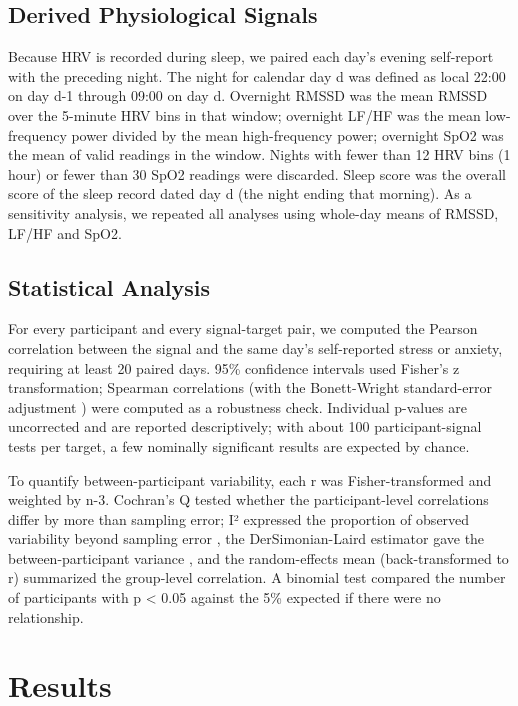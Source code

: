 \documentclass[11pt, a4paper, oneside]{article}
\begin{document}
\subsection{Derived Physiological Signals}
Because HRV is recorded during sleep, we paired each day's evening self-report with the preceding night. The night for calendar day d was defined as local 22:00 on day d-1 through 09:00 on day d. Overnight RMSSD was the mean RMSSD over the 5-minute HRV bins in that window; overnight LF/HF was the mean low-frequency power divided by the mean high-frequency power; overnight SpO2 was the mean of valid readings in the window. Nights with fewer than 12 HRV bins (1 hour) or fewer than 30 SpO2 readings were discarded. Sleep score was the overall score of the sleep record dated day d (the night ending that morning). As a sensitivity analysis, we repeated all analyses using whole-day means of RMSSD, LF/HF and SpO2.

\subsection{Statistical Analysis}
For every participant and every signal-target pair, we computed the Pearson correlation between the signal and the same day's self-reported stress or anxiety, requiring at least 20 paired days. 95\% confidence intervals used Fisher's z transformation; Spearman correlations (with the Bonett-Wright standard-error adjustment \cite{reference 10}) were computed as a robustness check. Individual p-values are uncorrected and are reported descriptively; with about 100 participant-signal tests per target, a few nominally significant results are expected by chance.

To quantify between-participant variability, each r was Fisher-transformed and weighted by n-3. Cochran's Q tested whether the participant-level correlations differ by more than sampling error; I² expressed the proportion of observed variability beyond sampling error \cite{reference 12}, the DerSimonian-Laird estimator gave the between-participant variance \cite{reference 11}, and the random-effects mean (back-transformed to r) summarized the group-level correlation. A binomial test compared the number of participants with p < 0.05 against the 5\% expected if there were no relationship.

\section{Results}
\end{document}
